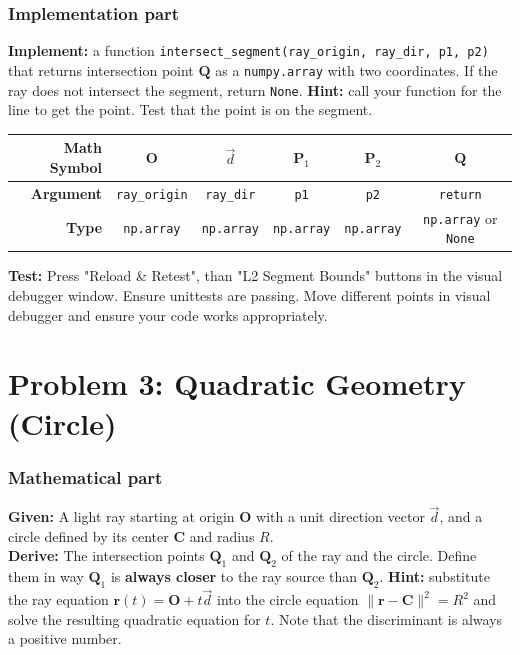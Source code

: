 \documentclass[11pt]{article}
\begin{document}
\subsubsection*{Implementation part}
\textbf{Implement:} a function \lstinline|intersect_segment(ray_origin, ray_dir, p1, p2)| that returns intersection point $\mathbf{Q}$ as a \lstinline|numpy.array| with two coordinates. If the ray does not intersect the segment, return \lstinline|None|. \textbf{Hint:} call your function for the line to get the point. Test that the point is on the segment.

\begin{center}
\renewcommand{\arraystretch}{2.0}
\begin{tabular}{r | c | c | c | c | c}
\toprule
\textbf{Math Symbol} & $\mathbf{O}$ & $\vec{d}$ & $\mathbf{P}_1$ & $\mathbf{P}_2$ & $\mathbf{Q}$ \\ \midrule
\textbf{Argument} & \lstinline|ray_origin| & \lstinline|ray_dir| & \lstinline|p1| & \lstinline|p2| & \lstinline|return| \\ \midrule
\textbf{Type} & \lstinline|np.array| & \lstinline|np.array| & \lstinline|np.array| & \lstinline|np.array| & \lstinline|np.array| or \lstinline|None| \\
\bottomrule
\end{tabular}
\end{center}
\textbf{Test:} Press "Reload \& Retest", than "L2 Segment Bounds" buttons in the visual debugger window. Ensure unittests are passing. Move different points in visual debugger and ensure your code works appropriately.


\section*{Problem 3: Quadratic Geometry (Circle)}

\subsubsection*{Mathematical part}
\textbf{Given:} A light ray starting at origin $\mathbf{O}$ with a unit direction vector $\vec{d}$, and a circle defined by its center $\mathbf{C}$ and radius $R$. \\
\textbf{Derive:} The intersection points $\mathbf{Q}_1$ and $\mathbf{Q}_2$ of the ray and the circle. Define them in way $\mathbf{Q}_1$ is \textbf{always closer} to the ray source than $\mathbf{Q}_2$. \textbf{Hint:} substitute the ray equation $\mathbf{r}(t) = \mathbf{O} + t\vec{d}$ into the circle equation $\|\mathbf{r} - \mathbf{C}\|^2 = R^2$ and solve the resulting quadratic equation for $t$. Note that the discriminant is always a positive number.
\end{document}
